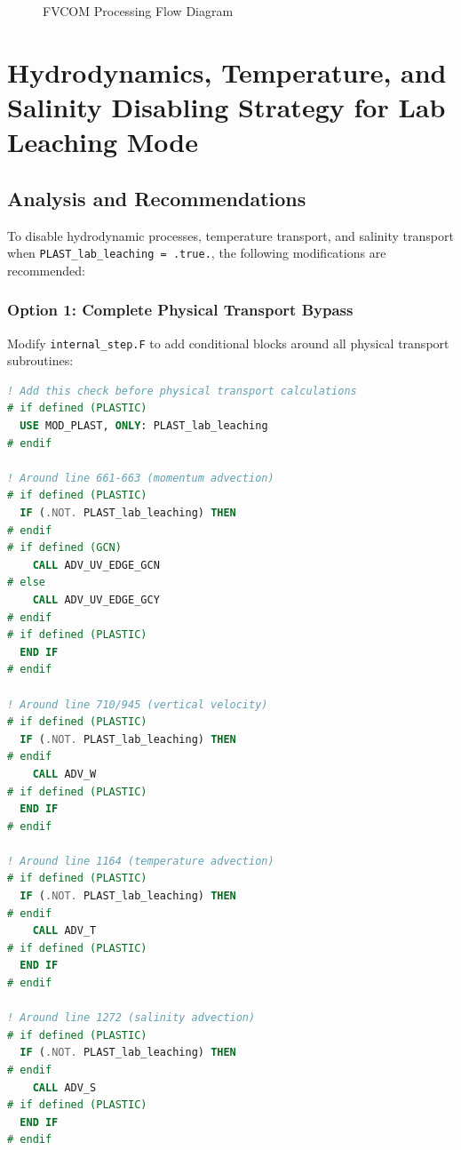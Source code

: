 \documentclass[12pt,a4paper]{article}
\begin{document}
\begin{figure}[H]
\caption{FVCOM Processing Flow Diagram}
\label{fig:fvcom_flow}
\end{figure}

\section{Hydrodynamics, Temperature, and Salinity Disabling Strategy for Lab Leaching Mode}

\subsection{Analysis and Recommendations}

To disable hydrodynamic processes, temperature transport, and salinity transport when \texttt{PLAST\_lab\_leaching = .true.}, the following modifications are recommended:

\subsubsection{Option 1: Complete Physical Transport Bypass}

Modify \texttt{internal\_step.F} to add conditional blocks around all physical transport subroutines:

\begin{lstlisting}[language=Fortran, caption=Proposed Modification in internal\_step.F]
! Add this check before physical transport calculations
# if defined (PLASTIC)
  USE MOD_PLAST, ONLY: PLAST_lab_leaching
# endif

! Around line 661-663 (momentum advection)
# if defined (PLASTIC)
  IF (.NOT. PLAST_lab_leaching) THEN
# endif
# if defined (GCN)
    CALL ADV_UV_EDGE_GCN
# else
    CALL ADV_UV_EDGE_GCY
# endif
# if defined (PLASTIC)
  END IF
# endif

! Around line 710/945 (vertical velocity)
# if defined (PLASTIC)
  IF (.NOT. PLAST_lab_leaching) THEN
# endif
    CALL ADV_W
# if defined (PLASTIC)
  END IF
# endif

! Around line 1164 (temperature advection)
# if defined (PLASTIC)
  IF (.NOT. PLAST_lab_leaching) THEN
# endif
    CALL ADV_T
# if defined (PLASTIC)
  END IF
# endif

! Around line 1272 (salinity advection)
# if defined (PLASTIC)
  IF (.NOT. PLAST_lab_leaching) THEN
# endif
    CALL ADV_S
# if defined (PLASTIC)
  END IF
# endif
\end{lstlisting}
\end{document}

